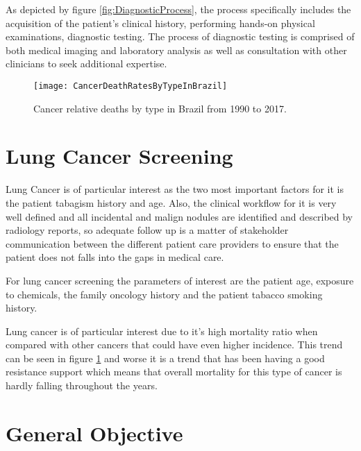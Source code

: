 As depicted by figure \ref{fig:DiagnosticProcess}, the process specifically includes the acquisition of the patient’s clinical history, performing hands-on physical examinations, diagnostic testing. The process of diagnostic testing is comprised of both medical imaging and laboratory analysis as well as consultation with other clinicians to seek additional expertise.

\begin{figure}
\begin{centering}
\texttt{[image: CancerDeathRatesByTypeInBrazil]}
\par\end{centering}
\caption{\label{fig:cancer_deaths_in_brazil}Cancer relative deaths by type in Brazil from 1990 to 2017.}

\end{figure}

\section{Lung Cancer Screening}

Lung Cancer is of particular interest as the two most important factors for it is the patient tabagism history and age\cite{fleischner2017}. Also, the clinical workflow for it is very well defined and all incidental and malign nodules are identified and described by radiology reports, so adequate follow up is a matter of stakeholder communication between the different patient care providers to ensure that the patient does not falls into the gaps in medical care. 

For lung cancer screening the parameters of interest are the patient age, exposure to chemicals, the family oncology history and the patient tabacco smoking history\cite{fleischner2017}\cite{parasuraman2000}\cite{jaklitsch2012}.

Lung cancer is of particular interest due to it's high mortality ratio when compared with other cancers that could have even higher incidence. This trend can be seen in figure \ref{fig:cancer_deaths_in_brazil} and worse it is a trend that has been having a good resistance support which means that overall mortality for this type of cancer is hardly falling throughout the years.

\section{General Objective}

